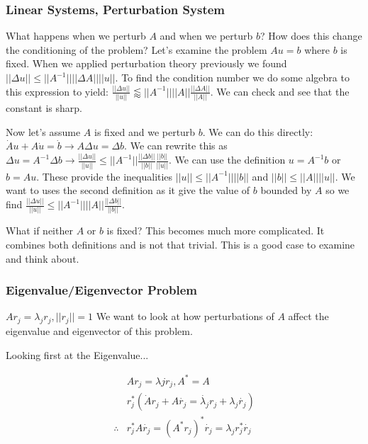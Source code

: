 \documentclass{article}
\newcommand{\n}{\newline}
\begin{document}
	\subsubsection{Linear Systems, Perturbation System}
	
	What happens when we perturb $A$ and when we perturb $b$?  How does this change the conditioning of the problem?  Let's examine the problem $Au=b$ where $b$ is fixed.  When we applied perturbation theory previously we found $||\Delta u||\leq||A^{-1}||||\Delta A||||u||$.  To find the condition number we do some algebra to this expression to yield: $\frac{||\Delta u||}{||u||}\lessapprox||A^{-1}||||A||\frac{||\Delta A||}{||A||}$.  We can check and see that the constant is sharp.    \n
	
	Now let's assume $A$ is fixed and we perturb $b$.  We can do this directly: $\dot{A}u+A\dot{u}=\dot{b}\rightarrow A\Delta u=\Delta b$.  We can rewrite this as $\Delta u=A^{-1}\Delta b\rightarrow\frac{||\Delta u||}{||u||}\leq ||A^{-1}||\frac{||\Delta b||}{||b||}\frac{||b||}{||u||}$.  We can use the definition $u=A^{-1}b$ or $b=Au$.  These provide the inequalities $||u||\leq||A^{-1}||||b||$ and $||b||\leq||A||||u||$.  We want to uses the second definition as it give the value of $b$ bounded by $A$ so we find $\frac{||\Delta u||}{||u||}\leq||A^{-1}||||A||\frac{||\Delta b||}{||b||}$.\n
	
	What if neither $A$ or $b$ is fixed?  This becomes much more complicated.  It combines both definitions and is not that trivial.  This is a good case to examine and think about.
	
	\subsubsection{Eigenvalue/Eigenvector Problem}
	
	$Ar_{j}=\lambda_{j}r_{j},||r_{j}||=1$  We want to look at how perturbations of $A$ affect the eigenvalue and eigenvector of this problem. \n
	
	Looking first at the Eigenvalue...
	
	\begin{align*}
		&Ar_{j}=\lambda{j}r_{j},A^{*}=A\\
		&r_{j}^{*}(\dot{A}r_{j}+A\dot{r_{j}}=\dot{\lambda_{j}}r_{j}+\lambda_{j}\dot{r_{j}})\\
		\therefore &r_{j}^{*}A\dot{r_{j}}=(A^{*}r_{j})^{*}\dot{r_{j}}=\lambda_{j}r_{j}^{*}\dot{r_{j}}\\
	\end{align*}
	
\end{document}
